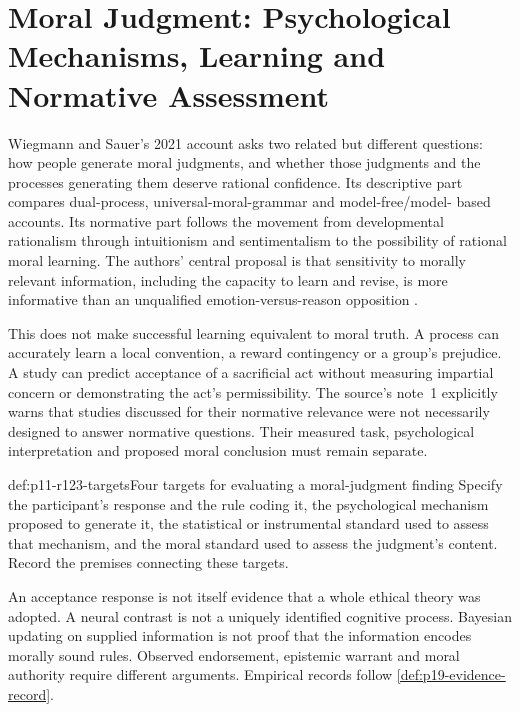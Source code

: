 \chapter{Moral Judgment: Psychological Mechanisms, Learning and Normative Assessment}
\label{sec:p11-rationality-12-3}

Wiegmann and Sauer's 2021 account asks two related but different questions:
how people generate moral judgments, and whether those judgments and the
processes generating them deserve rational confidence. Its descriptive
part compares dual-process, universal-moral-grammar and model-free/model-
based accounts. Its normative part follows the movement from developmental
rationalism through intuitionism and sentimentalism to the possibility of
rational moral learning. The authors' central proposal is that sensitivity
to morally relevant information, including the capacity to learn and revise,
is more informative than an unqualified emotion-versus-reason opposition
\parencite[pp.~701--707]{WiegmannSauer2021MoralJudgment}.

This does not make successful learning equivalent to moral truth. A process
can accurately learn a local convention, a reward contingency or a group's
prejudice. A study can predict acceptance of a sacrificial act without
measuring impartial concern or demonstrating the act's permissibility.
The source's note~1 explicitly warns that studies discussed for their
normative relevance were not necessarily designed to answer normative
questions. Their measured task, psychological interpretation and proposed
moral conclusion must remain separate.

\begin{hbmethod}{def:p11-r123-targets}{Four targets for evaluating a moral-judgment finding}
Specify the participant's response and the rule coding it, the psychological
mechanism proposed to generate it, the statistical or instrumental standard
used to assess that mechanism, and the moral standard used to assess the
judgment's content. Record the premises connecting these targets.

An acceptance response is not itself evidence that a whole ethical theory
was adopted. A neural contrast is not a uniquely identified cognitive
process. Bayesian updating on supplied information is not proof that the
information encodes morally sound rules. Observed endorsement, epistemic
warrant and moral authority require different arguments. Empirical records
follow \cref{def:p19-evidence-record}.
\end{hbmethod}

